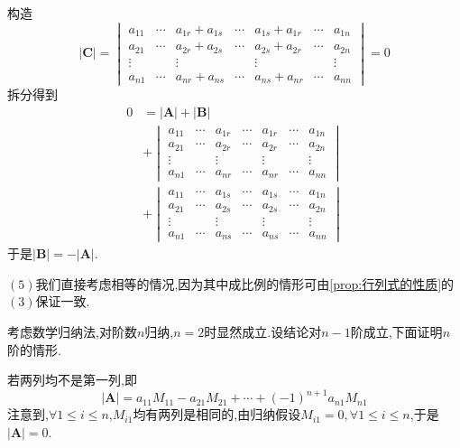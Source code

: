 \begin{green}
\begin{Proof}
    构造\[
    \left|\bm{C}\right|=\begin{vmatrix}
        a_{11}&\cdots&a_{1r}+a_{1s}&\cdots&a_{1s}+a_{1r}&\cdots&a_{1n}\\
        a_{21}&\cdots&a_{2r}+a_{2s}&\cdots&a_{2s}+a_{2r}&\cdots&a_{2n}\\
        \vdots& &\vdots& &\vdots& &\vdots\\
        a_{n1}&\cdots&a_{nr}+a_{ns}&\cdots&a_{ns}+a_{nr}&\cdots&a_{nn}
    \end{vmatrix}=0
    \]拆分得到
    \begin{align*}
        0&=\left|\bm{A}\right|+\left|\bm{B}\right|\\
        &+\begin{vmatrix}
            a_{11}&\cdots&a_{1r}&\cdots&a_{1r}&\cdots&a_{1n}\\
            a_{21}&\cdots&a_{2r}&\cdots&a_{2r}&\cdots&a_{2n}\\
            \vdots& &\vdots& &\vdots& &\vdots\\
            a_{n1}&\cdots&a_{nr}&\cdots&a_{nr}&\cdots&a_{nn}
        \end{vmatrix}\\
        &+\begin{vmatrix}
            a_{11}&\cdots&a_{1s}&\cdots&a_{1s}&\cdots&a_{1n}\\
            a_{21}&\cdots&a_{2s}&\cdots&a_{2s}&\cdots&a_{2n}\\
            \vdots& &\vdots& &\vdots& &\vdots\\
            a_{n1}&\cdots&a_{ns}&\cdots&a_{ns}&\cdots&a_{nn}
        \end{vmatrix}
    \end{align*}于是$\left|\bm{B}\right|=-\left|\bm{A}\right|.$

    $(5)$我们直接考虑相等的情况,因为其中成比例的情形可由\cref{prop:行列式的性质}的$(3)$保证一致.
    
    考虑数学归纳法,对阶数$n$归纳,$n=2$时显然成立.设结论对$n-1$阶成立,下面证明$n$阶的情形.

    若两列均不是第一列,即\[
    \left|\bm{A}\right|=a_{11}M_{11}-a_{21}M_{21}+\cdots+(-1)^{n+1}a_{n1}M_{n1}
    \]注意到,$\forall 1\leqslant i\leqslant n$,$M_{i1}$均有两列是相同的,由归纳假设$M_{i1}=0,\forall 1\leqslant i\leqslant n$,于是$\left|\bm{A}\right|=0.$


\end{Proof}
\end{green}
